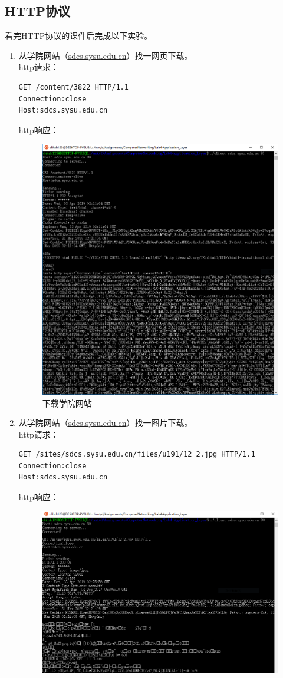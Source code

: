 \documentclass[logo,reportComp]{thesis}
\begin{document}
\subsection{HTTP协议}
看完HTTP协议的课件后完成以下实验。
\begin{enumerate}
    \item 从学院网站（\url{sdcs.sysu.edu.cn}）找一网页下载。\\
http请求：
\begin{lstlisting}
GET /content/3822 HTTP/1.1
Connection:close
Host:sdcs.sysu.edu.cn
\end{lstlisting}
http响应：
\begin{figure}[H]
\centering
\includegraphics[width=0.8\linewidth]{fig/http-1.PNG}
\caption{下载学院网站}
\label{fig:http-1}
\end{figure}
    \item 从学院网站（\url{sdcs.sysu.edu.cn}）找一图片下载。\\
http请求：
\begin{lstlisting}
GET /sites/sdcs.sysu.edu.cn/files/u191/12_2.jpg HTTP/1.1
Connection:close
Host:sdcs.sysu.edu.cn
\end{lstlisting}
http响应：
\begin{figure}[H]
\centering
\includegraphics[width=0.8\linewidth]{fig/http-2.PNG}

\end{figure}
\end{enumerate}
\end{document}

